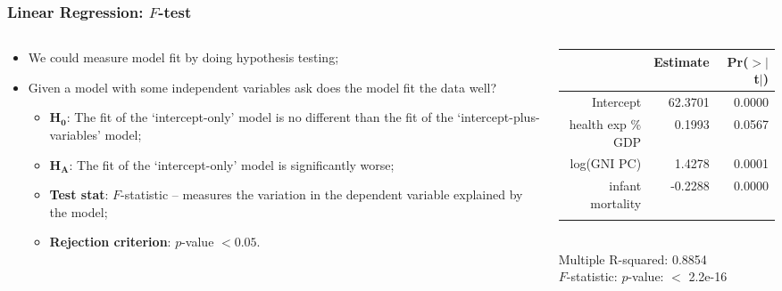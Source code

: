 \documentclass[aspectratio=169]{beamer}
\theoremstyle{principle}
\begin{document}
\begin{frame}
\frametitle{Linear Regression: $F$-test}

\begin{columns}
\begin{column}{0.5\textwidth}

\begin{itemize}
\item We could measure model fit by doing hypothesis testing;
\bigskip
\bigskip

\item Given a model with some independent variables ask does the model fit the data well?
\begin{itemize}
\item $\mathbf{H_0}$: The fit of the `intercept-only' model is no different than the fit of the `intercept-plus-variables' model;
\item $\mathbf{H_A}$: The fit of the `intercept-only' model is significantly worse;
\item \textbf{Test stat}: $F$-statistic -- measures the variation in the dependent variable explained by the model;
\item \textbf{Rejection criterion}: $p$-value $< 0.05$.
\end{itemize}


\end{itemize}

\end{column}
\begin{column}{0.5\textwidth}

\begin{table}[ht]
\centering
\begin{tabular}{rrr}
  \hline
   \hline
 & Estimate & Pr($>$$|$t$|$) \\ 
  \hline
   \hline
Intercept & 62.3701 & 0.0000 \\ 
  health exp \% GDP & 0.1993 & 0.0567 \\ 
  log(GNI PC) & 1.4278 & 0.0001 \\ 
  infant mortality & -0.2288 & 0.0000 \\ 
   \hline
   \hline
   &&\\
\end{tabular}\\
Multiple R-squared:  0.8854\\ 
\color{white}$F$-statistic: $p$-value: $<$ 2.2e-16
\end{table}

\end{column}
\end{columns}

\end{frame}
\end{document}
